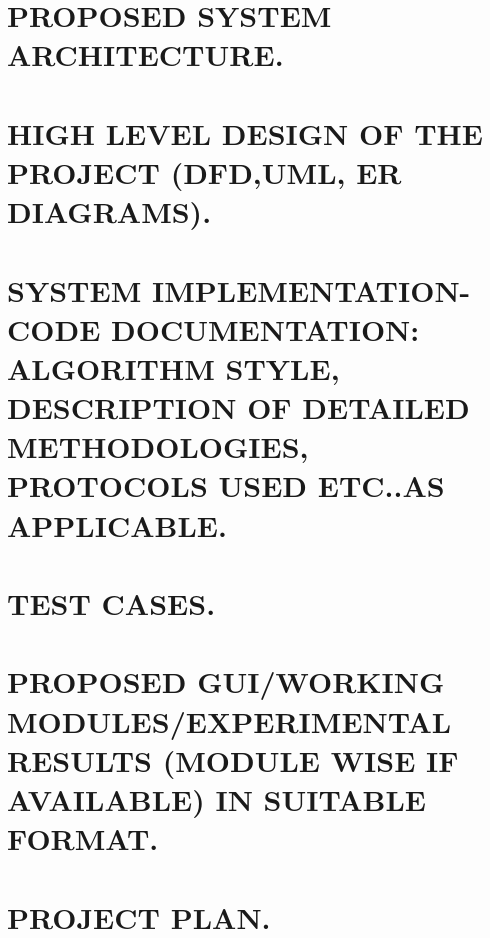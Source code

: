 \documentclass[12pt]{article}
\begin{document}
\section{\uppercase{\large{Proposed system Architecture.}}}

\section{\uppercase{\large{High level design of the project (DFD,UML, ER Diagrams).}}}

\section{\uppercase{\large{System implementation-code documentation: Algorithm style, Description of detailed methodologies,  protocols used etc..as applicable.}}}

\section{\uppercase{\large{Test cases.}}}

\section{\uppercase{\large{Proposed GUI/Working modules/Experimental Results (Module wise if available) in suitable format.}}}

\section{\uppercase{\large{Project Plan.}}}
\end{document}
